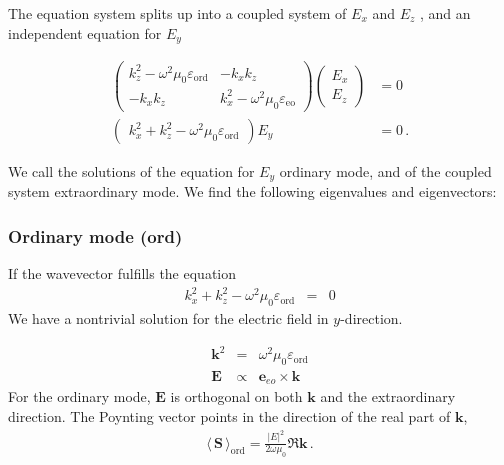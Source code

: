 \documentclass[12pt,a4paper,twoside,openright,BCOR10mm,headsepline,titlepage,abstracton,chapterprefix,final]{scrreprt}
\newcommand\Vector[1]{{\mathbf{#1}}}
\newcommand\vacuum{0}
\newcommand\wavenumber{k}
\newcommand\Wavevector{\Vector{\wavenumber}}
\newcommand\scalarEfield{E}
\newcommand\Efield{\Vector{\scalarEfield}}
\newcommand\vacuumpermeability{\scalarpermeability_{\vacuum}}
\newcommand\scalarpermeability{\mu}
\newcommand\scalarpermittivity{\varepsilon}
\newcommand\ordi{\text{ord}}
\newcommand\eo{\text{eo}}
\newcommand{\timeavg}[1]{{\langle\,#1\,\rangle}}
\begin{document}
The equation system splits up into a coupled system of $\scalarEfield_x$ and $\scalarEfield_z$ , and an independent equation for $\scalarEfield_y$

\begin{subequations}
\begin{align}
\begin{pmatrix}
 \wavenumber_z^2 - \omega^2 \vacuumpermeability \scalarpermittivity_{\ordi} 
 &
 - \wavenumber_x \wavenumber_z 
 \\
 - \wavenumber_x \wavenumber_z 
 &
 \wavenumber_x^2 - \omega^2 \vacuumpermeability \scalarpermittivity_{\eo}  
\end{pmatrix} 
\begin{pmatrix}
 \scalarEfield_x 
 \\
 \scalarEfield_z
\end{pmatrix}
&= 0
\\
\begin{pmatrix} \wavenumber_x^2 + \wavenumber_z^2 - \omega^2 \vacuumpermeability \scalarpermittivity_{\ordi} \end{pmatrix} \scalarEfield_y &= 0\,.
\end{align}
\end{subequations}

We call the solutions of the equation for $\scalarEfield_y$ ordinary mode, and of the coupled system extraordinary mode.
We find the following eigenvalues and eigenvectors:
\subsubsection{Ordinary mode (ord)}

If the wavevector fulfills the equation
\begin{eqnarray}
  \wavenumber_x^2 + \wavenumber_z^2 - \omega^2 \vacuumpermeability \scalarpermittivity_{\ordi} &=& 0 
\end{eqnarray}
We have a nontrivial solution for the electric field in $y$-direction.

\begin{eqnarray}
 \Wavevector^2 &=& \omega^2 \vacuumpermeability \scalarpermittivity_{\ordi} 
 \\
 \Efield &\propto& \Vector{e}_{eo} \times \Wavevector
\end{eqnarray}
For the ordinary mode, $\Efield$ is orthogonal on both $\Wavevector$ and the extraordinary direction.
The Poynting vector points in the direction of the real part of $\Wavevector$,
\begin{eqnarray}
 \timeavg{\Vector{S}}_\ordi = \frac{ |\scalarEfield|^2 }{ 2\omega\vacuumpermeability } \Re \Wavevector\,.\label{eq:Suniaxialordi}
\end{eqnarray}
\end{document}
